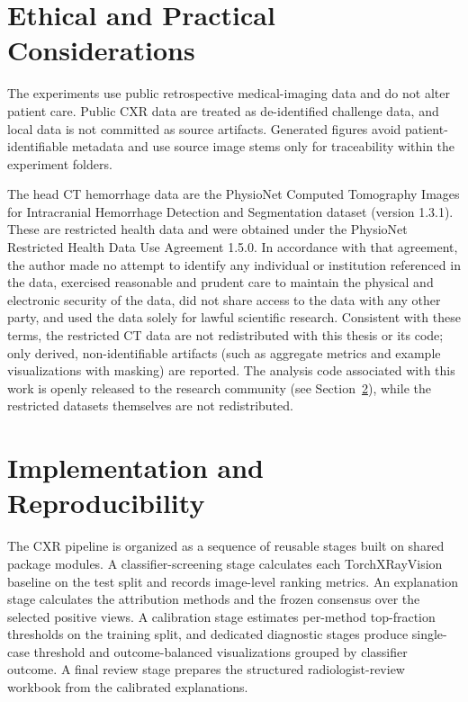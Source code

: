 \hypertarget{ethical-and-practical-considerations}{%
	\section{Ethical and Practical
		Considerations}\label{ethical-and-practical-considerations}}

The experiments use public retrospective medical-imaging data
and do not alter patient care. Public CXR data are treated as
de-identified challenge data, and local data is not committed as source artifacts.
Generated figures avoid patient-identifiable metadata and use source image 
stems only for traceability within the experiment folders.

The head CT hemorrhage data are the
PhysioNet Computed Tomography Images for Intracranial Hemorrhage
Detection and Segmentation dataset (version 1.3.1). These are restricted health data and 
were obtained under the PhysioNet Restricted
Health Data Use Agreement 1.5.0. In accordance with that agreement, the
author made no attempt to identify any individual or institution
referenced in the data, exercised reasonable and prudent care to
maintain the physical and electronic security of the data, did not share
access to the data with any other party, and used the data solely for
lawful scientific research. Consistent with these terms, the restricted
CT data are not redistributed with this thesis or its code; only
derived, non-identifiable artifacts (such as aggregate metrics and
example visualizations with masking) are reported. The analysis code
associated with this work is openly released to the research community
(see Section~\ref{implementation-and-reproducibility}), while the
restricted datasets themselves are not redistributed.

\hypertarget{implementation-and-reproducibility}{%
	\section{Implementation and
		Reproducibility}\label{implementation-and-reproducibility}}

The CXR pipeline is organized as a sequence of reusable stages built on
shared package modules. A classifier-screening stage calculates each
TorchXRayVision baseline on the test split and records image-level
ranking metrics. An explanation stage calculates the attribution methods and
the frozen consensus over the selected positive views. A calibration
stage estimates per-method top-fraction thresholds on the training
split, and dedicated diagnostic stages produce single-case threshold
 and outcome-balanced visualizations grouped by
classifier outcome. A final review stage prepares the structured
radiologist-review workbook from the calibrated explanations.

